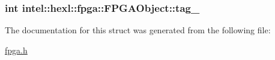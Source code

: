 \hypertarget{structintel_1_1hexl_1_1fpga_1_1FPGAObject_a246901212706cfac8299f3b47419f33f}{
\subsubsection[{tag\-\_\-}]{\setlength{\rightskip}{0pt plus 5cm}int intel\-::hexl\-::fpga\-::\-F\-P\-G\-A\-Object\-::tag\-\_\-}}\label{structintel_1_1hexl_1_1fpga_1_1FPGAObject_a246901212706cfac8299f3b47419f33f}


The documentation for this struct was generated from the following file\-:\begin{DoxyCompactItemize}
\item 
\hyperlink{fpga_8h}{fpga.\-h}\end{DoxyCompactItemize}
